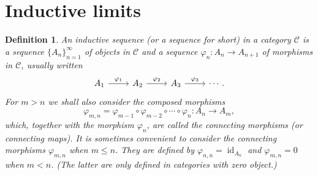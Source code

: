 \documentclass{book}
\newtheorem{definition}{Definition}[section]
\begin{document}
\section{Inductive limits}
\begin{definition}
  An \textnormal{inductive sequence} (or a sequence for short) in a category \(\mathcal{C}\) is a sequence
  \(\{A_n\}_{n=1}^\infty\) of objects in \(\mathcal{C}\) and a sequence \(\varphi_n:A_n\to A_{n+1}\) of morphisms
  in \(\mathcal{C}\), usually written
  \[
    \begin{tikzcd}
      A_1\arrow[r,"\varphi_1"]&A_2\arrow[r,"\varphi_2"]&A_3\arrow[r,"\varphi_3"]&\cdots.
    \end{tikzcd}
  \]  
  For \(m>n\) we shall also consider the composed morphisms
  \[
    \varphi_{m,n}=\varphi_{m-1}\circ\varphi_{m-2}\circ\cdots\circ\varphi_n:A_n\to A_m,
  \]
  which, together with the morphism \(\varphi_n\), are called the \textnormal{connecting morphisms} (or connecting maps).
  It is sometimes convenient to consider the connecting morphisms \(\varphi_{m,n}\) when \(m\leq n\).
  They are defined by \(\varphi_{n,n}=\operatorname{id}_{A_n}\) and 
  \(\varphi_{m,n}=0\) when \(m< n\). (The latter are only defined in categories with zero object.)
\end{definition}
\end{document}

